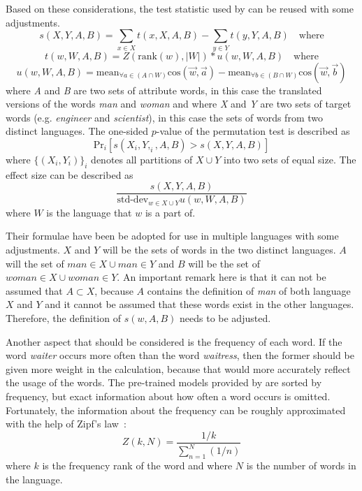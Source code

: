 Based on these considerations, the test statistic used by 
\textcite{caliskan_2017_semantics_language_corpora} can be reused with some adjustments. 
$$
s(X,Y,A,B) = \displaystyle\sum_{x \in X}t(x,X,A,B) - \displaystyle\sum_{y \in Y}t(y,Y,A,B)\quad\text{where}
$$
$$
t(w,W,A,B) = Z(\text{rank}(w), |W|) * u(w,W,A,B)\quad\text{where}
$$
$$
u(w,W,A,B) = \text{mean}_{\forall a \in (A \cap W)}\text{cos}(\overrightarrow{w}, \overrightarrow{a}) - \text{mean}_{\forall b \in (B \cap W)}\text{cos}(\overrightarrow{w}, \overrightarrow{b})
$$
where \textit{A} and \textit{B} are two sets of attribute words, in this case the
translated versions of the words \textit{man} and
\textit{woman} and where \textit{X} and \textit{Y} are two sets of target words
(e.g. \textit{engineer} and \textit{scientist}), in this case the sets of words from
two distinct languages. 
The one-sided $p$-value of the permutation test is described as
$$
\text{Pr}_i[s(X_i, Y,_i, A, B) > s(X,Y,A,B)]
$$
where $\{(X_i, Y_i)\}_i$ denotes all partitions of $X \cup Y$ into two sets of equal 
size.
The effect size can be described as
$$
\frac{
    s(X,Y,A,B)
}{
    \text{std-dev}_{w \in X \cup Y} u(w,W,A,B)
}
$$
where $W$ is the language that $w$ is a part of.

Their formulae have been be adopted for use in multiple languages with some adjustments. 
$X$ and $Y$ will be the sets of words in the two distinct languages.
$A$ will the set of $\textit{man} \in X \cup \textit{man} \in Y$ and $B$ will be
the set of $\textit{woman} \in X \cup \textit{woman} \in Y$. An important remark
here is that it can not be assumed that $A \subset X$, because $A$ contains 
the definition of \textit{man} of both language $X$ and $Y$ and it cannot be
assumed that these words exist in the other languages. Therefore, the definition of
$s(w,A,B)$ needs to be adjusted.

Another aspect that should be considered is the frequency of each word. If the
word \textit{waiter} occurs more often than the word \textit{waitress}, then the former
should be given more weight in the calculation, because that would more accurately 
reflect the usage of the words. The pre-trained
models provided by \textcite{grave2018learning} are sorted by frequency, but exact
information about how often a word occurs is omitted.
Fortunately, the information about the frequency can be roughly approximated with the
help of Zipf's law~\parencite{Zipf-1935}:
$$
Z(k, N) = \frac{1/k}{\displaystyle\sum_{n=1}^{N}(1/n)}
$$
where $k$ is the frequency rank of the word and where $N$ is the number of words in the
language.
